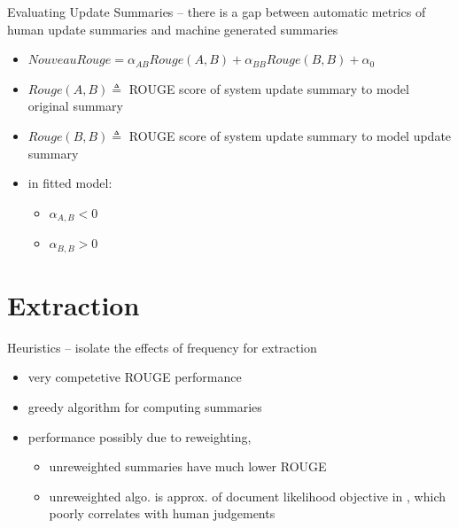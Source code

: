 \documentclass{beamer}
\begin{document}
\begin{frame}{Evaluating Update Summaries}
\cite{conroy2011nouveau} -- there is a gap between automatic metrics of human 
 update summaries and machine generated summaries
\begin{itemize}
\item $NouveauRouge = \alpha_{AB} Rouge(A,B) + \alpha_{BB} Rouge(B,B) + \alpha_0$
\item $Rouge(A,B) \triangleq$ ROUGE score of system update summary to 
         model original summary
\item $Rouge(B,B) \triangleq$ ROUGE score of system update summary to 
         model update summary
\item in fitted model: 
\begin{itemize}
\item $\alpha_{A,B} < 0$ 
\item $\alpha_{B,B} > 0$ 
\end{itemize}
\end{itemize}

\end{frame}

\section{Extraction}

\begin{frame}{Heuristics}
\cite{nenkova2005impact} -- isolate the effects of frequency for extraction
  
\begin{itemize}
\item very competetive ROUGE performance
\item greedy algorithm for computing summaries 
 \item performance possibly due to reweighting, 
\begin{itemize}
\item unreweighted summaries have 
    much lower ROUGE
\item unreweighted algo. is approx. of document likelihood objective in \cite{louis2009automatically}, which poorly correlates with human judgements
\end{itemize}
\end{itemize}

\end{frame}
\end{document}
